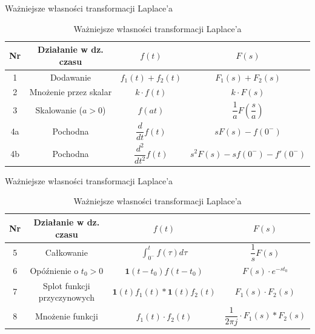 \begin{frame}{Ważniejsze własności transformacji Laplace'a}
	\begin{table}
		\centering
		\caption{Ważniejsze własności transformacji Laplace'a}
		\begin{tabular}{|c|c|c|c|}
			\hline
			Nr & Działanie w dz. czasu & $f(t)$                   & $F(s)$                                      \\[1ex]
			\hline
			1  & Dodawanie             & $f_1(t)+f_2(t)$          & $F_1(s)+F_2(s)$                             \\[1ex]
			\hline
			2  & Mnożenie przez skalar & $k \cdot f(t)$           & $k \cdot F(s)$                              \\[1ex]
			\hline
			3  & Skalowanie ($a>0$)    & $f(at)$                  & $\dfrac{1}{a} F\!\left(\dfrac{s}{a}\right)$ \\[1ex]
			\hline
			4a & Pochodna              & $\dfrac{d}{dt} f(t)$     & $sF(s)-f(0^{-})$                            \\[1ex]
			\hline
			4b & Pochodna              & $\dfrac{d^2}{dt^2} f(t)$ & $s^2F(s)-sf(0^{-})-f'(0^{-})$               \\[1ex]
			\hline
		\end{tabular}
	\end{table}
\end{frame}

\begin{frame}{Ważniejsze własności transformacji Laplace'a}
	\begin{table}
		\centering
		\caption{Ważniejsze własności transformacji Laplace'a}
		\begin{tabular}{|c|c|c|c|}
			\hline
			Nr & Działanie w dz. czasu       & $f(t)$                                        & $F(s)$                                     \\[1ex]
			\hline
			5  & Całkowanie                  & $\displaystyle \int_{0^{-}}^t f(\tau) d \tau$ & $\dfrac{1}{s} F(s)$                        \\[1ex]
			\hline
			6  & Opóźnienie o $t_0 > 0$      & $\mathbf{1}(t-t_0)f(t-t_0)$                   & $F(s) \cdot e^{- s t_0}$                   \\[1ex]
			\hline
			7  & Splot funkcji przyczynowych & $\mathbf{1}(t) f_1(t) * \mathbf{1}(t) f_2(t)$ & $F_1(s) \cdot F_2(s)$                      \\[1ex]
			\hline
			8  & Mnożenie funkcji            & $f_1(t) \cdot f_2(t)$                         & $\dfrac{1}{2 \pi j} \cdot F_1(s) * F_2(s)$ \\[1ex]
			\hline
		\end{tabular}
	\end{table}
\end{frame}


